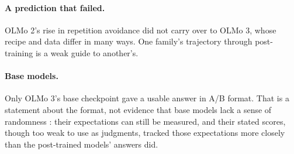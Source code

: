 \documentclass[11pt]{article}
\begin{document}
\paragraph{A prediction that failed.} OLMo 2's rise in repetition avoidance did not carry over to OLMo 3, whose recipe and data differ in many ways. One family's trajectory through post-training is a weak guide to another's.

\paragraph{Base models.} Only OLMo 3's base checkpoint gave a usable answer in A/B format. That is a statement about the format, not evidence that base models lack a sense of randomness \citep{hu2024auxiliary}: their expectations can still be measured, and their stated scores, though too weak to use as judgments, tracked those expectations more closely than the post-trained models' answers did.
\end{document}
